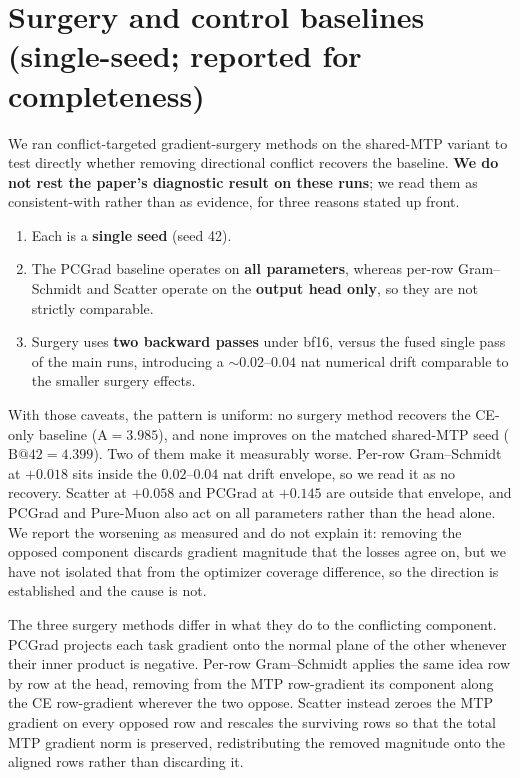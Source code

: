 \section{Surgery and control baselines (single-seed; reported for completeness)}
\label{app:surgery}

We ran conflict-targeted gradient-surgery methods on the shared-MTP variant to
test directly whether removing directional conflict recovers the baseline.
\textbf{We do not rest the paper's diagnostic result on these runs}; we read
them as consistent-with rather than as evidence, for three
reasons stated up front.
\begin{enumerate}
\item[(i)] Each is a \textbf{single seed} (seed 42).
\item[(ii)] The PCGrad baseline operates on \textbf{all parameters}, whereas
      per-row Gram--Schmidt and Scatter operate on the \textbf{output head
      only}, so they are not strictly comparable.
\item[(iii)] Surgery uses \textbf{two backward passes} under bf16, versus the
      fused single pass of the main runs, introducing a ${\sim}0.02$--$0.04$ nat
      numerical drift comparable to the smaller surgery effects.
\end{enumerate}
With those caveats, the pattern is uniform: no surgery method recovers the
CE-only baseline ($\text{A} = 3.985$), and none improves on the matched
shared-MTP seed ($\text{B@42} = 4.399$). Two of them make it measurably worse.
Per-row Gram--Schmidt at $+0.018$ sits inside the $0.02$--$0.04$ nat drift
envelope, so we read it as no recovery. Scatter at $+0.058$ and PCGrad at
$+0.145$ are outside that envelope, and PCGrad and Pure-Muon also act on all
parameters rather than the head alone. We report the worsening as measured and
do not explain it: removing the opposed component discards gradient magnitude
that the losses agree on, but we have not isolated that from the optimizer
coverage difference, so the direction is established and the cause is not.

The three surgery methods differ in what they do to the conflicting component. PCGrad
\citep{yu2020pcgrad} projects each task gradient onto the normal plane of the other
whenever their inner product is negative. Per-row Gram--Schmidt applies the same idea
row by row at the head, removing from the MTP row-gradient its component along the
CE row-gradient wherever the two oppose. Scatter instead zeroes the MTP gradient on
every opposed row and rescales the surviving rows so that the total MTP gradient norm
is preserved, redistributing the removed magnitude onto the aligned rows rather than
discarding it.

